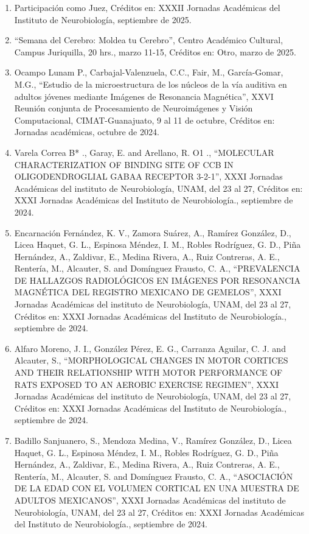 \begin{enumerate}
\item Participación como Juez, Créditos en: XXXII Jornadas Académicas del Instituto de Neurobiología, septiembre de 2025.

\item “Semana del Cerebro: Moldea tu Cerebro”, Centro Académico Cultural, Campus Juriquilla, 20 hrs., marzo 11-15, Créditos en: Otro, marzo 
de 
2025.

\item Ocampo Lunam P., Carbajal-Valenzuela, C.C., Fair, M., García-Gomar, M.G., “Estudio de la microestructura de los núcleos de la vía 
auditiva en 
adultos jóvenes mediante Imágenes de Resonancia Magnética”, XXVI Reunión conjunta de Procesamiento de Neuroimágenes y Visión Computacional, 
CIMAT-Guanajuato, 9 al 11 de octubre, Créditos en: Jornadas académicas, octubre de 2024.

\item Varela Correa B* ., Garay, E. and Arellano, R. O1 ., “MOLECULAR CHARACTERIZATION OF BINDING SITE OF CCB IN OLIGODENDROGLIAL GABAA 
RECEPTOR 3-2-1”, XXXI Jornadas Académicas del instituto de Neurobiología, UNAM, del 23 al 27, Créditos en: XXXI Jornadas Académicas del 
Instituto de 
Neurobiología., septiembre de 2024.

\item Encarnación Fernández, K. V., Zamora Suárez, A., Ramírez González, D., Licea Haquet, G. L., Espinosa Méndez, I. M., Robles Rodríguez, 
G. D., 
Piña Hernández, A., Zaldivar, E., Medina Rivera, A., Ruiz Contreras, A. E., Rentería, M., Alcauter, S. and Domínguez Frausto, C. A., 
“PREVALENCIA DE HALLAZGOS RADIOLÓGICOS EN IMÁGENES POR RESONANCIA MAGNÉTICA DEL REGISTRO MEXICANO DE GEMELOS”, XXXI Jornadas Académicas del 
instituto de Neurobiología, UNAM, del 23 al 27, Créditos en: XXXI Jornadas Académicas del Instituto de Neurobiología., septiembre de 2024.

\item Alfaro Moreno, J. I., González Pérez, E. G., Carranza Aguilar, C. J. and Alcauter, S., “MORPHOLOGICAL CHANGES IN MOTOR CORTICES AND 
THEIR 
RELATIONSHIP WITH MOTOR PERFORMANCE OF RATS EXPOSED TO AN AEROBIC EXERCISE REGIMEN”, XXXI Jornadas Académicas del instituto de Neurobiología, 
UNAM, del 23 al 27, Créditos en: XXXI Jornadas Académicas del Instituto de Neurobiología., septiembre de 2024.

\item Badillo Sanjuanero, S., Mendoza Medina, V., Ramírez González, D., Licea Haquet, G. L., Espinosa Méndez, I. M., Robles Rodríguez, G. D., 
Piña 
Hernández, A., Zaldivar, E., Medina Rivera, A., Ruiz Contreras, A. E., Rentería, M., Alcauter, S. and Domínguez Frausto, C. A., “ASOCIACIÓN 
DE LA EDAD CON EL VOLUMEN CORTICAL EN UNA MUESTRA DE ADULTOS MEXICANOS”, XXXI Jornadas Académicas del instituto de Neurobiología, UNAM, del 
23 al 27, Créditos en: XXXI Jornadas Académicas del Instituto de Neurobiología., septiembre de 2024.


\end{enumerate}
